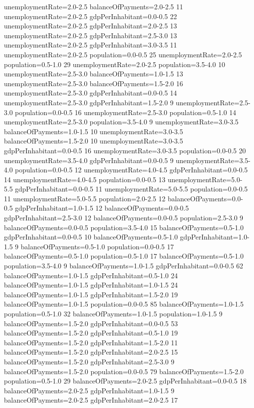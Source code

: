unemploymentRate=2.0-2.5 balanceOfPayments=2.0-2.5 11
unemploymentRate=2.0-2.5 gdpPerInhabitant=0.0-0.5 22
unemploymentRate=2.0-2.5 gdpPerInhabitant=2.0-2.5 13
unemploymentRate=2.0-2.5 gdpPerInhabitant=2.5-3.0 13
unemploymentRate=2.0-2.5 gdpPerInhabitant=3.0-3.5 11
unemploymentRate=2.0-2.5 population=0.0-0.5 25
unemploymentRate=2.0-2.5 population=0.5-1.0 29
unemploymentRate=2.0-2.5 population=3.5-4.0 10
unemploymentRate=2.5-3.0 balanceOfPayments=1.0-1.5 13
unemploymentRate=2.5-3.0 balanceOfPayments=1.5-2.0 16
unemploymentRate=2.5-3.0 gdpPerInhabitant=0.0-0.5 14
unemploymentRate=2.5-3.0 gdpPerInhabitant=1.5-2.0 9
unemploymentRate=2.5-3.0 population=0.0-0.5 16
unemploymentRate=2.5-3.0 population=0.5-1.0 14
unemploymentRate=2.5-3.0 population=3.5-4.0 9
unemploymentRate=3.0-3.5 balanceOfPayments=1.0-1.5 10
unemploymentRate=3.0-3.5 balanceOfPayments=1.5-2.0 10
unemploymentRate=3.0-3.5 gdpPerInhabitant=0.0-0.5 16
unemploymentRate=3.0-3.5 population=0.0-0.5 20
unemploymentRate=3.5-4.0 gdpPerInhabitant=0.0-0.5 9
unemploymentRate=3.5-4.0 population=0.0-0.5 12
unemploymentRate=4.0-4.5 gdpPerInhabitant=0.0-0.5 14
unemploymentRate=4.0-4.5 population=0.0-0.5 13
unemploymentRate=5.0-5.5 gdpPerInhabitant=0.0-0.5 11
unemploymentRate=5.0-5.5 population=0.0-0.5 11
unemploymentRate=5.0-5.5 population=2.0-2.5 12
balanceOfPayments=0.0-0.5 gdpPerInhabitant=1.0-1.5 12
balanceOfPayments=0.0-0.5 gdpPerInhabitant=2.5-3.0 12
balanceOfPayments=0.0-0.5 population=2.5-3.0 9
balanceOfPayments=0.0-0.5 population=3.5-4.0 15
balanceOfPayments=0.5-1.0 gdpPerInhabitant=0.0-0.5 10
balanceOfPayments=0.5-1.0 gdpPerInhabitant=1.0-1.5 9
balanceOfPayments=0.5-1.0 population=0.0-0.5 17
balanceOfPayments=0.5-1.0 population=0.5-1.0 17
balanceOfPayments=0.5-1.0 population=3.5-4.0 9
balanceOfPayments=1.0-1.5 gdpPerInhabitant=0.0-0.5 62
balanceOfPayments=1.0-1.5 gdpPerInhabitant=0.5-1.0 24
balanceOfPayments=1.0-1.5 gdpPerInhabitant=1.0-1.5 24
balanceOfPayments=1.0-1.5 gdpPerInhabitant=1.5-2.0 19
balanceOfPayments=1.0-1.5 population=0.0-0.5 85
balanceOfPayments=1.0-1.5 population=0.5-1.0 32
balanceOfPayments=1.0-1.5 population=1.0-1.5 9
balanceOfPayments=1.5-2.0 gdpPerInhabitant=0.0-0.5 53
balanceOfPayments=1.5-2.0 gdpPerInhabitant=0.5-1.0 19
balanceOfPayments=1.5-2.0 gdpPerInhabitant=1.5-2.0 11
balanceOfPayments=1.5-2.0 gdpPerInhabitant=2.0-2.5 15
balanceOfPayments=1.5-2.0 gdpPerInhabitant=2.5-3.0 9
balanceOfPayments=1.5-2.0 population=0.0-0.5 79
balanceOfPayments=1.5-2.0 population=0.5-1.0 29
balanceOfPayments=2.0-2.5 gdpPerInhabitant=0.0-0.5 18
balanceOfPayments=2.0-2.5 gdpPerInhabitant=1.0-1.5 9
balanceOfPayments=2.0-2.5 gdpPerInhabitant=2.0-2.5 17
